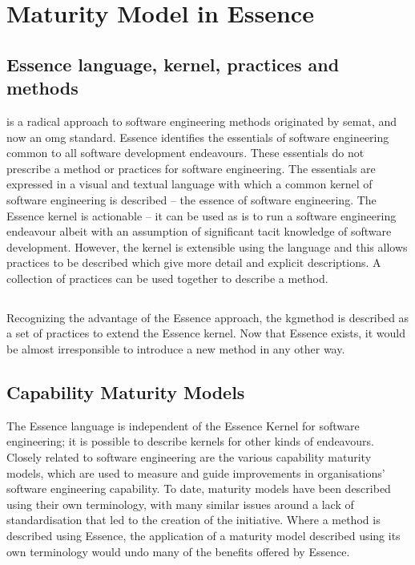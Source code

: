 \pagebreak
\chapter{Maturity Model in Essence}\label{ch:maturity-model-in-essence}

\section{Essence language, kernel, practices and methods}\label{subsec:essence-language-kernel-practices-and-methods}

 is a radical approach to software engineering methods originated by \gls{semat}, and now an \gls{omg} standard.
Essence identifies the essentials of software engineering common to all software development endeavours.
These essentials do not prescribe a method or practices for software engineering.
The essentials are expressed in a visual and textual language with which a common kernel of software engineering
is described -- the essence of software engineering.
The Essence kernel is actionable -- it can be used as is to run a software engineering endeavour albeit
with an assumption of significant tacit knowledge of software development.
However, the kernel is extensible using the language and this allows practices to be described which give more detail
and explicit descriptions.
A collection of practices can be used together to describe a method.

\section{}\label{subsec:agnos-ai-kg-method}

Recognizing the advantage of the Essence approach, the \agnos \gls{kgmethod} is described as
a set of practices to extend the Essence kernel.
Now that Essence exists, it would be almost irresponsible to introduce a new method in any other way.

\section{Capability Maturity Models}\label{subsec:capability-maturity-models}

The Essence language is independent of the Essence Kernel for software engineering;
it is possible to describe kernels for other kinds of endeavours.
Closely related to software engineering are the various capability maturity models, which are used to measure and
guide improvements in organisations' software engineering capability.
To date, maturity models have been described using their own terminology, with many similar issues around a lack of
standardisation that led to the creation of the  initiative.
Where a method is described using Essence, the application of a maturity model described using its own
terminology would undo many of the benefits offered by Essence.

